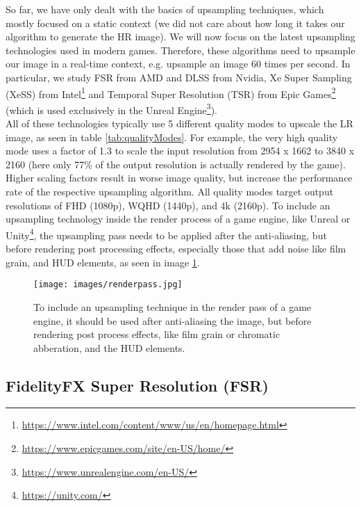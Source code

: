 \documentclass[letterpaper, 10 pt, conference]{ieeeconf}  %
\begin{document}
So far, we have only dealt with the basics of upsampling techniques, which mostly focused on a static context (we did not care about how long it takes our algorithm to generate the HR image).
We will now focus on the latest upsampling technologies used in modern games. Therefore, these algorithms need to upsample our image in a real-time context, e.g. upsample an image 60 times per second.
In particular, we study FSR from AMD and DLSS from Nvidia, 
Xe Super Sampling (XeSS) \cite{XeSS_intro} from Intel\footnote{\url{https://www.intel.com/content/www/us/en/homepage.html}} 
and Temporal Super Resolution (TSR) \cite{TSR_intro} from Epic Games\footnote{\url{https://www.epicgames.com/site/en-US/home/}} (which is used exclusively in the Unreal Engine\footnote{\url{https://www.unrealengine.com/en-US/}}). \\
All of these technologies typically use 5 different quality modes to upscale the LR image, as seen in table \ref{tab:qualityModes}. 
For example, the very high quality mode uses a factor of 1.3 to scale the input resolution from 2954 x 1662 to 3840 x 2160 (here only 77\% of the output resolution is actually rendered by the game).
Higher scaling factors result in worse image quality, but increase the performance rate of the respective upsampling algorithm.
All quality modes target output resolutions of FHD (1080p), WQHD (1440p), and 4k (2160p).
To include an upsampling technology inside the render process of a game engine, like Unreal or Unity\footnote{\url{https://unity.com/}}, 
the upsampling pass needs to be applied after the anti-aliasing, but before rendering post processing effects, especially those that add noise like film grain, and HUD elements, as seen in image \ref{fig:renderpass}.

\begin{figure}[!ht]
    \caption{To include an upsampling technique in the render pass of a game engine, 
    it should be used after anti-aliasing the image, but before rendering post process effects, 
    like film grain or chromatic abberation, and the HUD elements.}
    \centering
    \texttt{[image: images/renderpass.jpg]}
    \label{fig:renderpass}
\end{figure}

\subsection{FidelityFX Super Resolution (FSR)}
\end{document}
